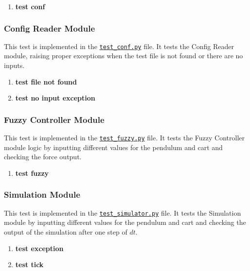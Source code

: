 \documentclass[12pt, titlepage]{article}
\newcommand{\UTthetestnum}{UT\theutestnum}
\begin{document}
\begin{enumerate}
  \item[\refstepcounter{utestnum} \UTthetestnum:] \textbf{test conf}
\end{enumerate}

\subsubsection{Config Reader Module}
This test is implemented in the
\href{https://github.com/mirzaim/ipcs/blob/main/test/test_conf.py}{\texttt{test\_conf.py}}
file. It tests the Config Reader module, raising proper exceptions when
the test file is not found or there are no inputs.

\begin{enumerate}
  \item[\refstepcounter{utestnum} \UTthetestnum:] \textbf{test file not found}
  \item[\refstepcounter{utestnum} \UTthetestnum:] \textbf{test no input exception}
\end{enumerate}

\subsubsection{Fuzzy Controller Module}
This test is implemented in the
\href{https://github.com/mirzaim/ipcs/blob/main/test/test_fuzzy.py}{\texttt{test\_fuzzy.py}}
file. It tests the Fuzzy Controller module logic by inputting different
values for the pendulum and cart and checking the force output.

\begin{enumerate}
  \item[\refstepcounter{utestnum} \UTthetestnum:] \textbf{test fuzzy}
\end{enumerate}

\subsubsection{Simulation Module}
This test is implemented in the
\href{https://github.com/mirzaim/ipcs/blob/main/test/test_simulator.py}{\texttt{test\_simulator.py}}
file. It tests the Simulation module by inputting different values for the
pendulum and cart and checking the output of the simulation after one step of $dt$.

\begin{enumerate}
  \item[\refstepcounter{utestnum} \UTthetestnum:] \textbf{test exception}
  \item[\refstepcounter{utestnum} \UTthetestnum:] \textbf{test tick}
\end{enumerate}
\end{document}
